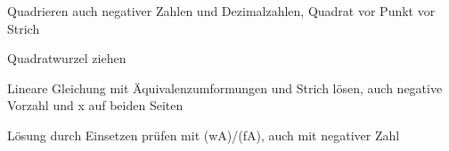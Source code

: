 \setcounter{aufgabe}{0}

\begin{aufgabe}{Quadrieren auch negativer Zahlen und Dezimalzahlen, Quadrat vor Punkt vor Strich}
\end{aufgabe}

\begin{aufgabe}{Quadratwurzel ziehen}
\end{aufgabe}

\begin{aufgabe}{Lineare Gleichung mit Äquivalenzumformungen und Strich lösen, auch negative Vorzahl und x auf beiden Seiten}
\end{aufgabe}

\begin{aufgabe}{Lösung durch Einsetzen prüfen mit (wA)/(fA), auch mit negativer Zahl}
\end{aufgabe}

